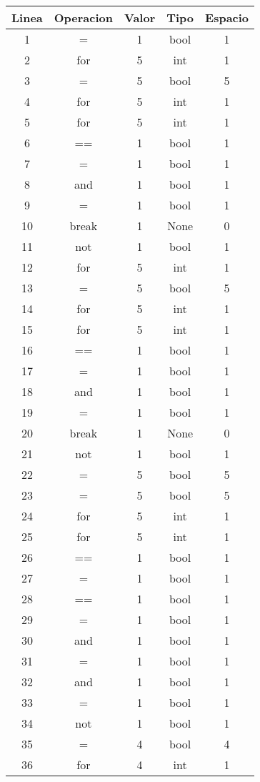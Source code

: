 \documentclass[10pt,twocolumn]{article}
\begin{document}
\begin{table}[h]
\centering
\begin{tabular}{|c|c|c|c|c|}
\hline
\textbf{Linea} & \textbf{Operacion} & \textbf{Valor} & \textbf{Tipo} & \textbf{Espacio} \\
\hline
1 & = & 1 & bool & 1 \\
2 & for & 5 & int & 1 \\
3 & = & 5 & bool & 5 \\
4 & for & 5 & int & 1 \\
5 & for & 5 & int & 1 \\
6 & == & 1 & bool & 1 \\
7 & = & 1 & bool & 1 \\
8 & and & 1 & bool & 1 \\
9 & = & 1 & bool & 1 \\
10 & break & 1 & None & 0 \\
11 & not & 1 & bool & 1 \\
12 & for & 5 & int & 1 \\
13 & = & 5 & bool & 5 \\
14 & for & 5 & int & 1 \\
15 & for & 5 & int & 1 \\
16 & == & 1 & bool & 1 \\
17 & = & 1 & bool & 1 \\
18 & and & 1 & bool & 1 \\
19 & = & 1 & bool & 1 \\
20 & break & 1 & None & 0 \\
21 & not & 1 & bool & 1 \\
22 & = & 5 & bool & 5 \\
23 & = & 5 & bool & 5 \\
24 & for & 5 & int & 1 \\
25 & for & 5 & int & 1 \\
26 & == & 1 & bool & 1 \\
27 & = & 1 & bool & 1 \\
28 & == & 1 & bool & 1 \\
29 & = & 1 & bool & 1 \\
30 & and & 1 & bool & 1 \\
31 & = & 1 & bool & 1 \\
32 & and & 1 & bool & 1 \\
33 & = & 1 & bool & 1 \\
34 & not & 1 & bool & 1 \\
35 & = & 4 & bool & 4 \\
36 & for & 4 & int & 1 \\

\end{tabular}
\end{table}
\end{document}
